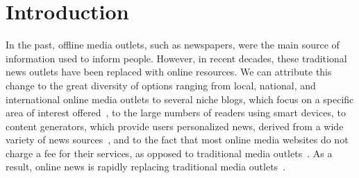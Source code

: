 \documentclass{sig-alternate}
\begin{document}
\section{Introduction}
\label{sec:introduction}

In the past, offline media outlets, such as newspapers, were the main source of information used to inform people.
However, in recent decades, these traditional news outlets have been replaced with online resources.
We can attribute this change to the great diversity of options ranging from local, national, and international online media outlets to several niche blogs, which focus on a specific area of interest offered~\cite{chakraborty2016stop}, to the large numbers of readers using smart devices, to content generators, which provide users personalized news, derived from a wide variety of news sources~\cite{lavie2010user}, and to the fact that most online media websites do not charge a fee for their services, as opposed to traditional media outlets~\cite{chakraborty2016stop}.
As a result, online news is rapidly replacing traditional media outlets~\cite{lavie2010user}. 
\end{document}
